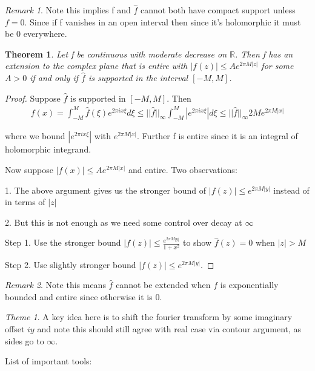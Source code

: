 \documentclass[11pt]{article}
\newcommand{\R}{\mathbb{R}}
\newtheorem{theorem}{Theorem}
\theoremstyle{remark}
\newtheorem{remark}{Remark}
\newtheorem{theme}{Theme}
\begin{document}
\begin{remark}
	Note this implies f and $\hat{f}$ cannot both have compact support unless $f=0$. Since if f vanishes in an open interval then since it's holomorphic it must be 0 everywhere.
\end{remark}

\begin{theorem}
	Let f be continuous with moderate decrease on $\R$. Then f has an extension to the complex plane that is entire with $|f(z)| \leq A e^{2\pi M |z|}$ for some $A > 0$ if and only if $\hat{f}$ is supported in the interval $[-M,M]$. 
\end{theorem}

\begin{proof}
	Suppose $\hat{f}$ is supported in $[-M,M]$. Then
	\begin{align*}
		f(x) = \int_{-M}^M\hat{f}(\xi)e^{2 \pi i x \xi}d\xi \leq ||\hat{f}||_{\infty} \int_{-M}^M |e^{2 \pi i x \xi}|d\xi \leq ||\hat{f}||_{\infty} 2M e^{2 \pi M |x|}
	\end{align*}

	where we bound $|e^{2\pi i x \xi}|$ with $e^{2 \pi M |x|}$. Further f is entire since it is an integral of holomorphic integrand.

	Now suppose $|f(x)| \leq A e^{2 \pi M |x|}$ and entire. Two observations:

	1. The above argument gives us the stronger bound of $|f(z)| \leq e^{2 \pi M |y|}$ instead of in terms of $|z|$

	2. But this is not enough as we need some control over decay at $\infty$

	Step 1. Use the stronger bound $|f(z)| \leq \frac{e^{2\pi M |y|}}{1+x^2}$ to show $\hat{f}(z) = 0$ when $|z| > M$

	Step 2. Use slightly stronger bound
	$|f(z)| \leq e^{2\pi M |y|}$. 
\end{proof}

\begin{remark}
	Note this means $\hat{f}$ cannot be extended when $f$ is exponentially bounded and entire since otherwise it is 0.
\end{remark}

\begin{theme}
	A key idea here is to shift the fourier transform by some imaginary offset $iy$ and note this should still agree with real case via contour argument, as sides go to $\infty$.
\end{theme}

List of important tools:
\end{document}
